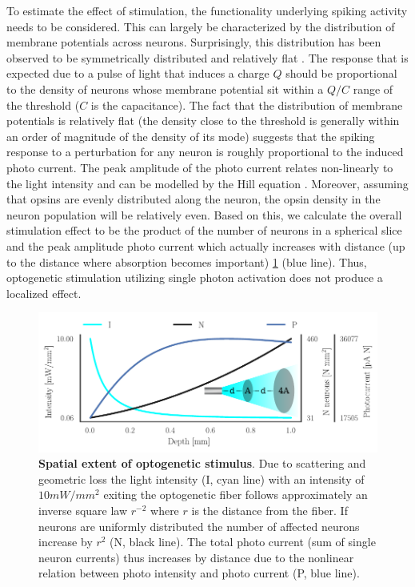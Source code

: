 \documentclass[11pt]{article}
\begin{document}
To estimate the effect of stimulation, the functionality underlying spiking activity needs to be considered. This can largely be characterized by the  distribution of membrane potentials across neurons. Surprisingly, this distribution has been observed to be symmetrically distributed and relatively flat \citep{pare1998impact,destexhe1999impact,rudolph2006use}. The response that is expected due to a pulse of light that induces a charge $Q$ should be proportional to the density of neurons whose membrane potential sit within a $Q/C$ range of the threshold ($C$ is the capacitance). The fact that the distribution of membrane potentials is relatively flat (the density close to the threshold is generally within an order of magnitude of the density of its mode) suggests that the spiking response to a perturbation for any neuron is roughly proportional to the induced photo current. The peak amplitude of the photo current relates non-linearly to the light intensity and can be modelled by the Hill equation \citep{wang2007high}. Moreover, assuming that opsins are evenly distributed along the neuron, the opsin density in the neuron population will be relatively even. Based on this, we calculate the overall stimulation effect to be the product of the number of neurons in a spherical slice and the peak amplitude photo current which actually increases with distance (up to the distance where absorption becomes important) \cref{fig:concept} (blue line). Thus, optogenetic stimulation utilizing single photon activation does not produce a localized effect. 

\begin{figure}\includegraphics[scale=1]{opto-powerlaw}
\caption{{\bf Spatial extent of optogenetic stimulus}. Due to scattering and geometric loss the light intensity (I, cyan line) with an intensity of $10 mW/mm^2$ exiting the optogenetic fiber follows approximately an inverse square law $ r^{-2} $ where $ r $ is the distance from the fiber. If neurons are uniformly distributed the number of affected neurons increase by $ r^{2} $ (N, black line). The total photo current (sum of single neuron currents) thus increases by distance due to the nonlinear relation between photo intensity and photo current (P, blue line). \label{fig:concept}}
\end{figure}
\FloatBarrier
\end{document}
